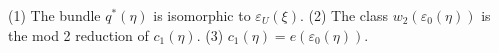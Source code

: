 (1) The bundle $q^*(\eta)$ is isomorphic to $\varepsilon_U(\xi)$.
(2) The class $w_2(\varepsilon_0(\eta))$ is the mod 2 reduction of $c_1(\eta)$.
(3) $c_1(\eta) = e(\varepsilon_0(\eta))$.
